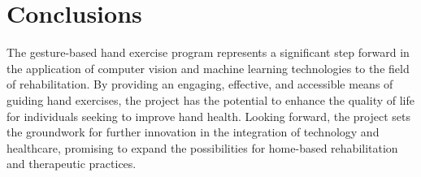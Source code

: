 \documentclass[12pt, letterpaper, twoside]{article}
\begin{document}
\section{Conclusions}
    The gesture-based hand exercise program represents a significant step forward in the application of computer vision and machine learning technologies to the field of rehabilitation. By providing an engaging, effective, and accessible means of guiding hand exercises, the project has the potential to enhance the quality of life for individuals seeking to improve hand health. Looking forward, the project sets the groundwork for further innovation in the integration of technology and healthcare, promising to expand the possibilities for home-based rehabilitation and therapeutic practices.
\end{document}
